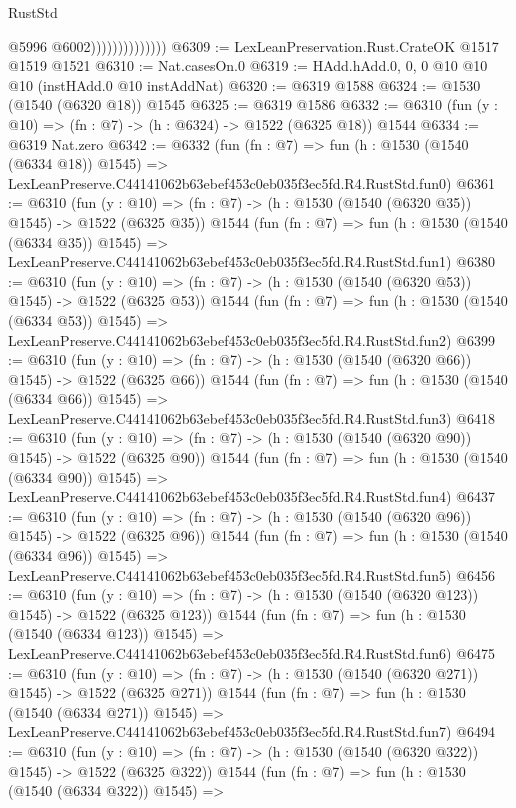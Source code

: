 \begin{lexlean}{RustStd}
\begin{coremodule}
                                @5996
                                @6002))))))))))))))
@6309 := LexLeanPreservation.Rust.CrateOK @1517 @1519 @1521
@6310 := Nat.casesOn.{0}
@6319 := HAdd.hAdd.{0, 0, 0} @10 @10 @10 (instHAdd.{0} @10 instAddNat)
@6320 := @6319 @1588
@6324 := @1530 (@1540 (@6320 @18)) @1545
@6325 := @6319 @1586
@6332 := @6310 (fun (y : @10) => (fn : @7) -> (h : @6324) -> @1522 (@6325 @18)) @1544
@6334 := @6319 Nat.zero
@6342 := @6332
    (fun (fn : @7) =>
    fun (h : @1530 (@1540 (@6334 @18)) @1545) =>
    LexLeanPreserve.C44141062b63ebef453c0eb035f3ec5fd.R4.RustStd.fun0)
@6361 := @6310
    (fun (y : @10) => (fn : @7) -> (h : @1530 (@1540 (@6320 @35)) @1545) -> @1522 (@6325 @35))
    @1544
    (fun (fn : @7) =>
    fun (h : @1530 (@1540 (@6334 @35)) @1545) =>
    LexLeanPreserve.C44141062b63ebef453c0eb035f3ec5fd.R4.RustStd.fun1)
@6380 := @6310
    (fun (y : @10) => (fn : @7) -> (h : @1530 (@1540 (@6320 @53)) @1545) -> @1522 (@6325 @53))
    @1544
    (fun (fn : @7) =>
    fun (h : @1530 (@1540 (@6334 @53)) @1545) =>
    LexLeanPreserve.C44141062b63ebef453c0eb035f3ec5fd.R4.RustStd.fun2)
@6399 := @6310
    (fun (y : @10) => (fn : @7) -> (h : @1530 (@1540 (@6320 @66)) @1545) -> @1522 (@6325 @66))
    @1544
    (fun (fn : @7) =>
    fun (h : @1530 (@1540 (@6334 @66)) @1545) =>
    LexLeanPreserve.C44141062b63ebef453c0eb035f3ec5fd.R4.RustStd.fun3)
@6418 := @6310
    (fun (y : @10) => (fn : @7) -> (h : @1530 (@1540 (@6320 @90)) @1545) -> @1522 (@6325 @90))
    @1544
    (fun (fn : @7) =>
    fun (h : @1530 (@1540 (@6334 @90)) @1545) =>
    LexLeanPreserve.C44141062b63ebef453c0eb035f3ec5fd.R4.RustStd.fun4)
@6437 := @6310
    (fun (y : @10) => (fn : @7) -> (h : @1530 (@1540 (@6320 @96)) @1545) -> @1522 (@6325 @96))
    @1544
    (fun (fn : @7) =>
    fun (h : @1530 (@1540 (@6334 @96)) @1545) =>
    LexLeanPreserve.C44141062b63ebef453c0eb035f3ec5fd.R4.RustStd.fun5)
@6456 := @6310
    (fun (y : @10) => (fn : @7) -> (h : @1530 (@1540 (@6320 @123)) @1545) -> @1522 (@6325 @123))
    @1544
    (fun (fn : @7) =>
    fun (h : @1530 (@1540 (@6334 @123)) @1545) =>
    LexLeanPreserve.C44141062b63ebef453c0eb035f3ec5fd.R4.RustStd.fun6)
@6475 := @6310
    (fun (y : @10) => (fn : @7) -> (h : @1530 (@1540 (@6320 @271)) @1545) -> @1522 (@6325 @271))
    @1544
    (fun (fn : @7) =>
    fun (h : @1530 (@1540 (@6334 @271)) @1545) =>
    LexLeanPreserve.C44141062b63ebef453c0eb035f3ec5fd.R4.RustStd.fun7)
@6494 := @6310
    (fun (y : @10) => (fn : @7) -> (h : @1530 (@1540 (@6320 @322)) @1545) -> @1522 (@6325 @322))
    @1544
    (fun (fn : @7) =>
    fun (h : @1530 (@1540 (@6334 @322)) @1545) =>

\end{coremodule}
\end{lexlean}

